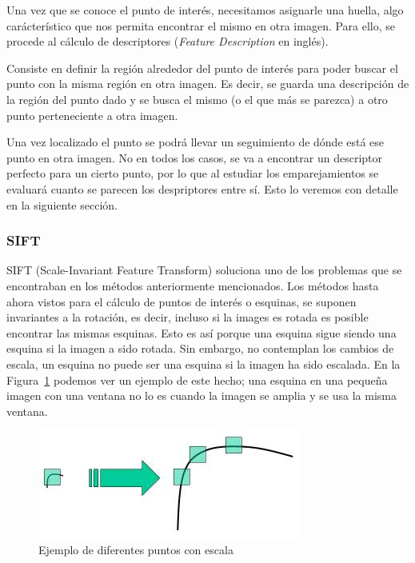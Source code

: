 Una vez que se conoce el punto de interés, necesitamos asignarle una huella, algo carácterístico que nos permita encontrar el mismo en otra imagen. Para ello, se procede al cálculo de descriptores (\textit{Feature Description} en inglés).

Consiste en definir la región alrededor del punto de interés para poder buscar el punto con la misma región en otra imagen. Es decir, se guarda una descripción de la región del punto dado y se busca el mismo (o el que más se parezca) a otro punto perteneciente a otra imagen.

Una vez localizado el punto se podrá llevar un seguimiento de dónde está ese punto en otra imagen. No en todos los casos, se va a encontrar un descriptor perfecto para un cierto punto, por lo que al estudiar los emparejamientos se evaluará cuanto se parecen los despriptores entre sí. Esto lo veremos con detalle en la siguiente sección.

\subsubsection{SIFT}

SIFT (Scale-Invariant Feature Transform) soluciona uno de los problemas que se encontraban en los métodos anteriormente mencionados. Los métodos hasta ahora vistos para el cálculo de puntos de interés o esquinas, se suponen invariantes a la rotación, es decir, incluso si la images es rotada es posible encontrar las mismas esquinas. Esto es así porque una esquina sigue siendo una esquina si la imagen a sido rotada. Sin embargo, no contemplan los cambios de escala, un esquina no puede ser una esquina si la imagen ha sido escalada. En la Figura~\ref{fig:sift_scale_invariant} podemos ver un ejemplo de este hecho; una esquina en una pequeña imagen con una ventana no lo es cuando la imagen se amplia y se usa la misma ventana.

\begin{figure}[ht]
\centering
\includegraphics[scale=0.8]{Figures/sift_scale_invariant.jpg}
\decoRule
\caption[Ejemplo de sistema escalarmente variante]{Ejemplo de diferentes puntos con escala}
\label{fig:sift_scale_invariant}
\end{figure}


